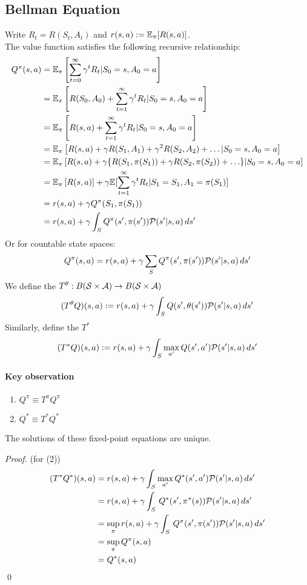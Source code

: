 \documentclass[11pt]{article}
\begin{document}
\subsection{Bellman Equation}
Write $R_t = R(S_t, A_t)$ and $r(s,a) := \mathbb{E}_\pi[R(s,a)]$.\\
The value function satisfies the following recursive relationship:
\begin{align}
	Q^\pi(s, a) &= \mathbb{E}_\pi\left[ \sum_{t=0}^\infty \gamma^tR_t|S_0 = s, A_0 = a\right] \\
	&= \mathbb{E}_\pi\left[R(S_0, A_0) + \sum_{t=1}^\infty \gamma^tR_t|S_0 = s, A_0 = a\right] \\
	&= \mathbb{E}_\pi\left[R(s, a) + \sum_{t=1}^\infty \gamma^tR_t|S_0 = s, A_0 = a\right] \\
	&= \mathbb{E}_\pi\left[ R(s, a) + \gamma R(S_1, A_1) + \gamma^2R(S_2, A_2) + \hdots|S_0=s, A_0=a\right]\\
	&= \mathbb{E}_\pi\left[ R(s, a) + \gamma\{R(S_1, \pi(S_1)) + \gamma R(S_2, \pi(S_2)) + \hdots\}|S_0=s, A_0=a\right]\\
	&= \mathbb{E}_\pi\left[ R(s, a) \right] + \gamma\mathbb{E}[{\sum_{t=1}^\infty\gamma^tR_{t}|S_1=S_1, A_1=\pi(S_1)}]\\
	&= r(s,a) + \gamma  Q^\pi(S_1, \pi(S_1)) \\
	&= r(s,a) + \gamma \int_S Q^\pi(s', \pi(s'))\mathcal{P}(s'|s,a)\,ds'
\end{align}
Or for countable state spaces:
$$Q^\pi(s, a) = r(s,a) + \gamma \sum_S Q^\pi(s', \pi(s'))\mathcal{P}(s'|s,a)\,ds'$$
We define the  $T^\theta: B(\mathcal{S} \times \mathcal{A}) \rightarrow B(\mathcal{S} \times \mathcal{A})$
$$(T^\theta Q)(s,a) := r(s,a) + \gamma \int_S Q(s', \theta(s'))\mathcal{P}(s'|s,a)\,ds'$$
Similarly, define the  $T^*$
$$(T^* Q)(s,a) := r(s,a) + \gamma \int_S\underset{a'}{\max}\,Q(s', a')\mathcal{P}(s'|s,a)\,ds'$$

\paragraph{Key observation}
\begin{enumerate}
	\item $ Q^\pi \equiv T^\pi Q^\pi$ 
	\item $Q^* \equiv T^*Q^*$
\end{enumerate}
The solutions of these fixed-point equations are unique.
\begin{proof} (for (2))
\begin{align}
	(T^* Q^*)(s,a) &= r(s,a) + \gamma \int_S\underset{a'}{\max}\,Q^*(s', a')\mathcal{P}(s'|s,a)\,ds' \\
	&= r(s,a) + \gamma \int_S\,Q^*(s', \pi^*(s))\mathcal{P}(s'|s,a)\,ds' \\
	&= \underset{\pi}{\sup} \, r(s,a) + \gamma \int_S\,Q^\pi(s', \pi(s'))\mathcal{P}(s'|s,a)\,ds' \\
	&= \underset{\pi}{\sup} \, Q^\pi (s,a) \\
	&= Q^*(s,a)
\end{align} \qed
\end{proof}
\end{document}
